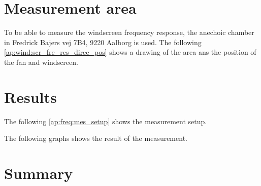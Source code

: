 \section*{Measurement area}
To be able to measure the windscreen frequency response, the anechoic chamber in Fredrick Bajers vej 7B4, 9220 Aalborg is used. The following \autoref{ap:wind:scr_fre_res_direc_pos} shows a drawing of the area ans the position of the fan and windscreen.


\section*{Results}

The following \autoref{ap:freq:mes_setup} shows the measurement setup.


The following graphs shows the result of the measurement. 









\section*{Summary}

 